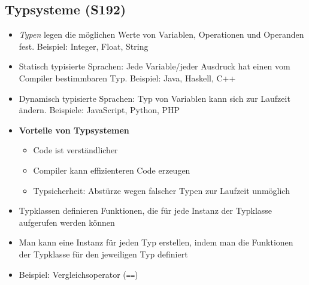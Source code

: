 \subsection{Typsysteme (S192)}
\begin{itemize}
	\item \textit{Typen} legen die möglichen Werte von Variablen, Operationen und Operanden fest. Beispiel: Integer, Float, String
	\item Statisch typisierte Sprachen: Jede Variable/jeder Ausdruck hat einen vom Compiler bestimmbaren Typ. Beispiel: Java, Haskell, C++
	\item Dynamisch typisierte Sprachen: Typ von Variablen kann sich zur Laufzeit ändern. Beispiele: JavaScript, Python, PHP
	\item \textbf{Vorteile von Typsystemen}
	\begin{itemize}
		\item Code ist verständlicher
		\item Compiler kann effizienteren Code erzeugen
		\item Typsicherheit: Abstürze wegen falscher Typen zur Laufzeit unmöglich
	\end{itemize}
	\item Typklassen definieren Funktionen, die für jede Instanz der Typklasse aufgerufen werden können
	\item Man kann eine Instanz für jeden Typ erstellen, indem man die Funktionen der Typklasse für den jeweiligen Typ definiert
	\item Beispiel: Vergleichsoperator (\texttt{==})
\end{itemize}


